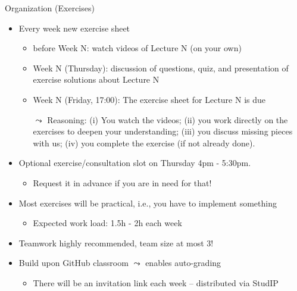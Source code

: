 \documentclass[aspectratio=169, handout]{../latex_main/tntbeamer}  %
\begin{document}
\begin{frame}[c]{Organization (Exercises)}

\begin{itemize}
  \item Every week new exercise sheet
  \begin{itemize}
    \item before Week N: watch videos of Lecture N (on your own)
    \item Week N (Thursday): discussion of questions, quiz, and presentation of exercise solutions about Lecture N
    \item Week N (Friday, 17:00): The exercise sheet for Lecture N is due
    \item[$\leadsto$] \alert{Reasoning:} (i) You watch the videos; (ii) you work directly on the exercises to deepen your understanding; (iii) you discuss missing pieces with us; (iv) you complete the exercise (if not already done).
  \end{itemize}
  \item Optional exercise/consultation slot on Thursday 4pm - 5:30pm. 
  \begin{itemize}
      \item Request it in advance if you are in need for that!
  \end{itemize}
  \item Most exercises will be practical, i.e., you have to implement something
  \begin{itemize}
    \item Expected work load: 1.5h - 2h each week
  \end{itemize}
  \item Teamwork highly recommended, team size at most 3! 
  \item Build upon GitHub classroom $\leadsto$ enables auto-grading
  \begin{itemize}
      \item There will be an invitation link each week -- distributed via StudIP
  \end{itemize}
\end{itemize}

\end{frame}
\end{document}
